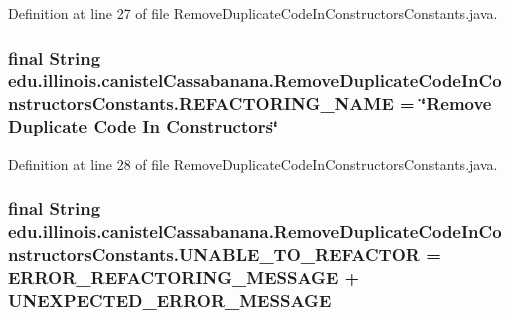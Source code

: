 Definition at line 27 of file RemoveDuplicateCodeInConstructorsConstants.java.

\hypertarget{classedu_1_1illinois_1_1canistelCassabanana_1_1RemoveDuplicateCodeInConstructorsConstants_a6731b6d50436db4f3f9a0ecb1ba760fe}{
\subsubsection[{REFACTORING\_\-NAME}]{\setlength{\rightskip}{0pt plus 5cm}final String {\bf edu.illinois.canistelCassabanana.RemoveDuplicateCodeInConstructorsConstants.REFACTORING\_\-NAME} = \char`\"{}Remove Duplicate Code In Constructors\char`\"{}}}
\label{classedu_1_1illinois_1_1canistelCassabanana_1_1RemoveDuplicateCodeInConstructorsConstants_a6731b6d50436db4f3f9a0ecb1ba760fe}


Definition at line 28 of file RemoveDuplicateCodeInConstructorsConstants.java.

\hypertarget{classedu_1_1illinois_1_1canistelCassabanana_1_1RemoveDuplicateCodeInConstructorsConstants_af6677744b84dd45adf12fd7b89ed48ac}{
\subsubsection[{UNABLE\_\-TO\_\-REFACTOR}]{\setlength{\rightskip}{0pt plus 5cm}final String {\bf edu.illinois.canistelCassabanana.RemoveDuplicateCodeInConstructorsConstants.UNABLE\_\-TO\_\-REFACTOR} = {\bf ERROR\_\-REFACTORING\_\-MESSAGE} + {\bf UNEXPECTED\_\-ERROR\_\-MESSAGE}}}
\label{classedu_1_1illinois_1_1canistelCassabanana_1_1RemoveDuplicateCodeInConstructorsConstants_af6677744b84dd45adf12fd7b89ed48ac}


